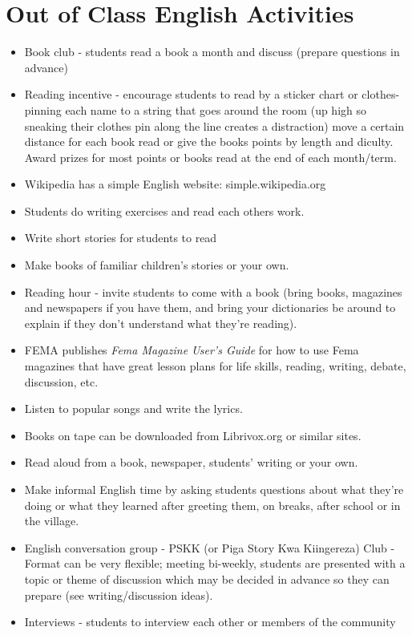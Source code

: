 \section{Out of Class English Activities}
\begin{itemize}
\item Book club - students read a book a month and discuss (prepare questions
in advance)  
\item Reading incentive - encourage students to read by a sticker chart
or clothes-pinning each name to a string that goes around the room
(up high so sneaking their clothes pin along the line creates a distraction)
move a certain distance for each book read or give the books points
by length and diculty. Award prizes for most points or books read
at the end of each month/term. 
\item Wikipedia has a simple English website: simple.wikipedia.org  
\item Students do writing exercises and read each others work. 
\item Write short stories for students to read 
\item Make books of familiar children's stories or your own.  
\item Reading hour - invite students to come with a book (bring books, magazines
and newspapers if you have them, and bring your dictionaries be around
to explain if they don't understand what they're reading).  
\item FEMA publishes \textit{Fema Magazine User's Guide } for how to use
Fema magazines that have great lesson plans for life skills, reading,
writing, debate, discussion, etc. 
\item Listen to popular songs and write the lyrics.  
\item Books on tape can be downloaded from Librivox.org or similar sites. 
\item Read aloud from a book, newspaper, students' writing or your own. 
\item Make informal English time by asking students questions about what
they're doing or what they learned after greeting them, on breaks,
after school or in the village. 
\item English conversation group - PSKK (or Piga Story Kwa Kiingereza) Club
- Format can be very flexible; meeting bi-weekly, students are presented
with a topic or theme of discussion which may be decided in advance
so they can prepare (see writing/discussion ideas). 
\item Interviews - students to interview each other or members of the community

\end{itemize}
